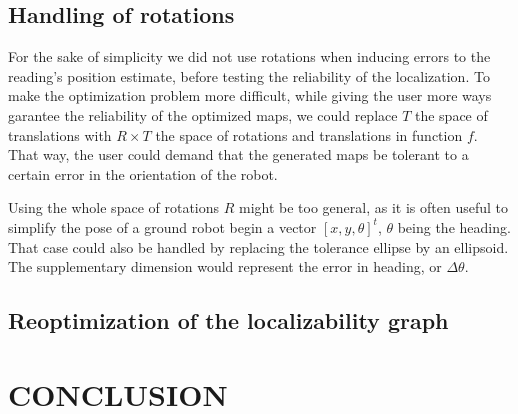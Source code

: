\documentclass[letterpaper,10 pt,conference]{ieeeconf}
\begin{document}
\subsection{Handling of rotations}

For the sake of simplicity we did not use rotations when inducing errors to the reading's
position estimate, before testing the reliability of the localization. To make the optimization
problem more difficult, while giving the user more ways garantee the reliability of the optimized
maps, we could replace $T$ the space of translations with $R \times T$ the space of rotations and
translations in function $f$. That way, the user could demand that the generated maps be tolerant to
a certain error in the orientation of the robot.

Using the whole space of rotations $R$ might be too general, as it is often useful to simplify the pose of a
ground robot begin a vector $[x, y, \theta]^t$, $\theta$ being the heading. That case could also be
handled by replacing the tolerance ellipse by an ellipsoid. The supplementary dimension would
represent the error in heading, or $\Delta \theta$.

\subsection{Reoptimization of the localizability graph}



\section{CONCLUSION}
\end{document}
